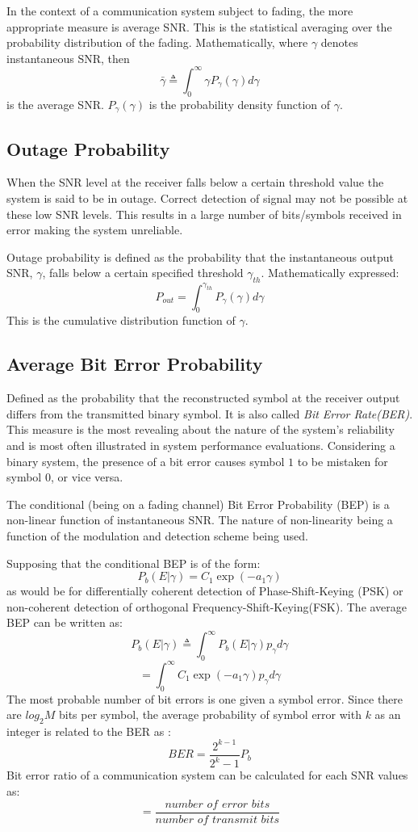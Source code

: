 In the context of a communication system subject to fading, the more appropriate measure is average SNR. This is the statistical averaging over the probability distribution of the fading. Mathematically, where $\gamma$ denotes instantaneous SNR, then
$$\bar{\gamma} \triangleq \int_0^{\infty} \gamma P_{\gamma} \left(\gamma\right) d\gamma$$
is the average SNR. $P_{\gamma} \left(\gamma\right)$ is the probability density function of $\gamma$.

\subsection*{Outage Probability}
When the SNR level at the receiver falls below a certain threshold value the system is said to be in outage. Correct detection of signal may not be possible at these low SNR levels.
This results in a large number of bits/symbols received in error making the
system unreliable.\cite{MIMO}

Outage probability is defined as the probability that the instantaneous output SNR, $\gamma$, falls below a certain specified threshold $\gamma_{th}$.\cite{dcommoha} Mathematically expressed:
$$P_{out} = \int_0^{\gamma_{th}} P_{\gamma}\left(\gamma\right) d\gamma$$
This is the cumulative distribution function of $\gamma$.

\subsection*{Average Bit Error Probability}
Defined as the probability that the reconstructed symbol at the receiver output differs from the transmitted binary symbol. It is also called \textit{Bit Error Rate(BER)}. This measure is the most revealing about the nature of the system's reliability and is most often illustrated in system performance evaluations. Considering a binary system, the presence of a bit error causes symbol $1$ to be mistaken for symbol $0$, or
vice versa.\cite{hayk} 

The conditional (being on a fading channel) Bit Error Probability (BEP) is a non-linear function of instantaneous SNR. The nature of non-linearity being a function of the modulation and detection scheme being used.\cite{dcommoha}

Supposing that the conditional BEP is of the form:
$$P_b\left( E|\gamma\right) = C_1 \exp \left( -a_1\gamma\right)$$
as would be for differentially coherent detection of Phase-Shift-Keying (PSK) or non-coherent detection of orthogonal Frequency-Shift-Keying(FSK). The average BEP can be written as:
$$P_b\left( E|\gamma\right) \triangleq \int_0^{\infty} P_b\left( E|\gamma\right) p_{\gamma}d\gamma$$
$$=\int_0^{\infty} C_1 \exp \left( -a_1\gamma\right) p_{\gamma}d\gamma$$
The most probable number of bit errors is one given a symbol error. Since there are $log_2 M$ bits per
symbol, the average probability of symbol error with $k$ as an integer is related to the BER as :
$$BER=\frac{2^{k-1}}{2^{k}-1}P_b$$
Bit error ratio of a communication system can be calculated for each SNR values as:
$$ =\frac{\textit{number  of  error  bits}}{\textit{number  of  transmit  bits}}$$

